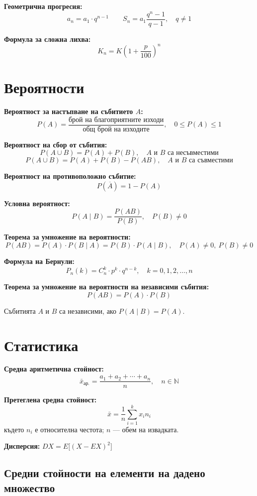 \documentclass[12pt,a4paper]{article}
\begin{document}
\textbf{Геометрична прогресия:}
$$a_n = a_1 \cdot q^{n-1} \qquad S_n = a_1\frac{q^n - 1}{q - 1},\quad q \neq 1$$

\textbf{Формула за сложна лихва:}
$$K_n = K\left(1 + \frac{p}{100}\right)^n$$

\section{Вероятности}

\textbf{Вероятност за настъпване на събитието $A$:}
$$P(A) = \frac{\text{брой на благоприятните изходи}}{\text{общ брой на изходите}},\quad 0 \leq P(A) \leq 1$$

\textbf{Вероятност на сбор от събития:}
$$P(A \cup B) = P(A) + P(B),\quad A\text{ и }B\text{ са несъвместими}$$
$$P(A \cup B) = P(A) + P(B) - P(AB),\quad A\text{ и }B\text{ са съвместими}$$

\textbf{Вероятност на противоположно събитие:}
$$P(\overline{A}) = 1 - P(A)$$

\textbf{Условна вероятност:}
$$P(A \mid B) = \frac{P(AB)}{P(B)},\quad P(B) \neq 0$$

\textbf{Теорема за умножение на вероятности:}
$$P(AB) = P(A)\cdot P(B \mid A) = P(B)\cdot P(A \mid B),\quad P(A) \neq 0,\ P(B) \neq 0$$

\textbf{Формула на Бернули:}
$$P_n(k) = C_n^k \cdot p^k \cdot q^{n-k},\quad k = 0, 1, 2, \ldots, n$$

\textbf{Теорема за умножение на вероятности на независими събития:}
$$P(AB) = P(A)\cdot P(B)$$

Събитията $A$ и $B$ са независими, ако $P(A \mid B) = P(A)$.

\section{Статистика}

\textbf{Средна аритметична стойност:}
$$\bar{x}_{\text{ар.}} = \frac{a_1 + a_2 + \cdots + a_n}{n},\quad n \in \mathbb{N}$$

\textbf{Претеглена средна стойност:}
$$\bar{x} = \frac{1}{n}\sum_{i=1}^{k} x_i n_i$$
където $n_i$ е относителна честота; $n$ --- обем на извадката.

\textbf{Дисперсия:} \quad $DX = E\big[(X - EX)^2\big]$

\subsection{Средни стойности на елементи на дадено множество}
\end{document}
